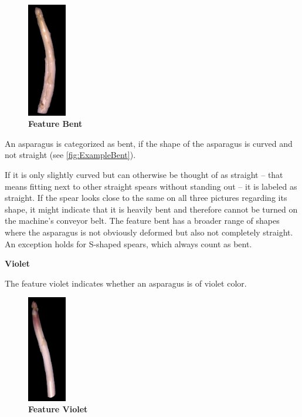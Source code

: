 \begin{figure}
  \vspace{-10pt}
  \begin{center}
    \includegraphics[width=0.15\textwidth]{Figures/chapter03/example_img_bent.png}
  \end{center}
  \vspace{-15pt}
  \caption[Example Image Feature Bent]{ \textbf{Feature Bent}~~~~~~~~}
  \label{fig:ExampleBent}
\end{figure}

An asparagus is categorized as bent, if the shape of the asparagus is curved and not straight (see \autoref{fig:ExampleBent}).

If it is only slightly curved but can otherwise be thought of as straight -- that means fitting next to other straight spears without standing out -- it is labeled as straight. 
If the spear looks close to the same on all three pictures regarding its shape, it might indicate that it is heavily bent and therefore cannot be turned on the machine’s conveyor belt.
The feature bent has a broader range of shapes where the asparagus is not obviously deformed but also not completely straight. An exception holds for S-shaped spears, which always count as bent.

\bigskip
\textbf{Violet}

The feature violet indicates whether an asparagus is of violet color.

\begin{figure}
  \vspace{-10pt}
  \begin{center}
    \includegraphics[width=0.15\textwidth]{Figures/chapter03/example_img_violet.png}
  \end{center}
  \vspace{-15pt}
  \caption[Example Image Feature Violet]{ \textbf{Feature Violet}}
  \vspace{-130pt}
  \label{fig:ExampleViolet}
\end{figure}


